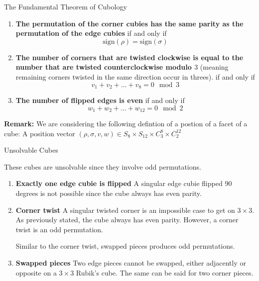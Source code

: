 \documentclass[final]{beamer}
\newlength{\colwidth}
\begin{document}
\begin{frame}[t]
\begin{columns}[t]
\begin{column}{\colwidth}
\begin{alertblock}{The Fundamental Theorem of Cubology}
    \begin{enumerate}
      \item \textbf{The permutation of the corner cubies has the same parity as the permutation of the edge cubies} 
      if and only if 
      $$\text{sign}(\rho) = \text{sign}(\sigma)$$
      \item \textbf{The number of corners that are twisted clockwise is equal to the number that are twisted counterclockwise modulo $3$}
      (meaning remaining corners twisted in the same direction occur in threes).
      if and only if 
      $$v_{1} + v_{2} +\dots +v_{8} = 0 \mod 3$$
      \item \textbf{The number of flipped edges is even}
      if and only if 
      $$w_{1} + w_{2} +\dots +w_{12} = 0 \mod 2$$
    \end{enumerate}

   \textbf{Remark:}  We are considering the following defintion of a postion of a facet of a cube:
    A position vector $(\rho,\sigma,v,w) \in S_{8} \times S_{12} \times C_{3}^{8} \times C_{2}^{12}$

  \end{alertblock}

  \begin{block}{Unsolvable Cubes}

    These cubes are unsolvable since they involve odd permutations.

    \begin{enumerate}
      
      \item \textbf{Exactly one edge cubie is flipped}
      A singular edge cubie flipped 90 degrees is not possible since the cube always has even parity.
      
      \item \textbf{Corner twist}
      A singular twisted corner is an impossible case to get on $3 \times 3$.
      As previously stated, the cube always has even parity. However, a corner twist is an odd permutation.
      

Similar to the corner twist, swapped pieces produces odd permutations.
      \item \textbf{Swapped pieces}
      Two edge pieces cannot be swapped, either adjacently or opposite on a $3 \times 3$ Rubik's cube. The same can be said for two corner pieces.
    \end{enumerate}


\end{block}
\end{column}
\end{columns}
\end{frame}
\end{document}
